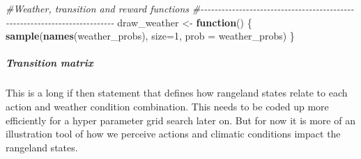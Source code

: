 \documentclass[
]{article}
\newenvironment{Shaded}{\begin{snugshade}}{\end{snugshade}}
\newcommand{\AttributeTok}[1]{\textcolor[rgb]{0.13,0.29,0.53}{#1}}
\newcommand{\CommentTok}[1]{\textcolor[rgb]{0.56,0.35,0.01}{\textit{#1}}}
\newcommand{\ControlFlowTok}[1]{\textcolor[rgb]{0.13,0.29,0.53}{\textbf{#1}}}
\newcommand{\DecValTok}[1]{\textcolor[rgb]{0.00,0.00,0.81}{#1}}
\newcommand{\FunctionTok}[1]{\textcolor[rgb]{0.13,0.29,0.53}{\textbf{#1}}}
\newcommand{\NormalTok}[1]{#1}
\newcommand{\OtherTok}[1]{\textcolor[rgb]{0.56,0.35,0.01}{#1}}
\begin{document}
\begin{Shaded}
\begin{Highlighting}[]
\CommentTok{\#Weather, transition and reward functions}
\CommentTok{\#{-}{-}{-}{-}{-}{-}{-}{-}{-}{-}{-}{-}{-}{-}{-}{-}{-}{-}{-}{-}{-}{-}{-}{-}{-}{-}{-}{-}{-}{-}{-}{-}{-}{-}{-}{-}{-}{-}{-}{-}{-}{-}{-}{-}{-}{-}{-}{-}{-}{-}{-}{-}{-}{-}{-}{-}{-}{-}{-}{-}{-}{-}{-}{-}{-}{-}{-}{-}{-}{-}{-}{-}{-}{-}{-}}
\NormalTok{draw\_weather }\OtherTok{\textless{}{-}} \ControlFlowTok{function}\NormalTok{() \{}
  \FunctionTok{sample}\NormalTok{(}\FunctionTok{names}\NormalTok{(weather\_probs), }\AttributeTok{size=}\DecValTok{1}\NormalTok{, }\AttributeTok{prob =}\NormalTok{ weather\_probs)}
\NormalTok{\}}
\end{Highlighting}
\end{Shaded}

\hypertarget{transition-matrix}{%
\subparagraph{Transition matrix}\label{transition-matrix}}

This is a long if then statement that defines how rangeland states
relate to each action and weather condition combination. This needs to
be coded up more efficiently for a hyper parameter grid search later on.
But for now it is more of an illustration tool of how we perceive
actions and climatic conditions impact the rangeland states.
\end{document}
